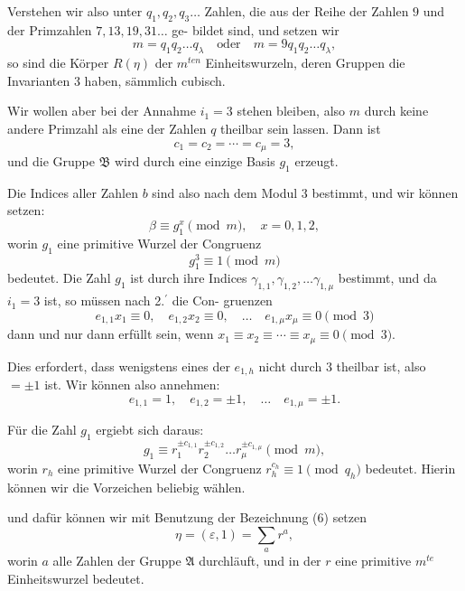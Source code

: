\documentclass[12pt,a4paper]{article}
\begin{document}
Verstehen wir also unter $q_1, q_2, q_3 \ldots$ Zahlen, die aus der
Reihe der Zahlen $9$ und der Primzahlen $7, 13, 19, 31\ldots$ ge-
bildet sind, und setzen wir
\[m = q_1 q_2 \ldots q_\lambda\quad \text{oder}\quad m = 9q_1 q_2 \ldots q_\lambda,\]
so sind die K\"orper $R(\eta)$ der $m^{ten}$ Einheitswurzeln, deren Gruppen
die Invarianten $3$ haben, s\"ammlich cubisch.

Wir wollen aber bei der Annahme $i_1 = 3$ stehen bleiben,
also $m$ durch keine andere Primzahl als eine der Zahlen $q$
theilbar sein lassen. Dann ist
\[c_1 = c_2 = \cdots = c_\mu = 3,\]
und die Gruppe $\mathfrak{B}$ wird durch eine einzige Basis $g_1$ erzeugt.

Die Indices aller Zahlen $b$ sind also nach dem Modul $3$
bestimmt, und wir k\"onnen setzen:
\begin{equation}\label{eq:k23-1}
\beta \equiv g_1^x \pmod{m},\quad x = 0, 1, 2,
\end{equation}
worin $g_1$ eine primitive Wurzel der Congruenz
\[g_1^3 \equiv 1 \pmod{m}\]
bedeutet. Die Zahl $g_1$ ist durch ihre Indices $\gamma_{1,1}, \gamma_{1,2}, \ldots \gamma_{1,\mu}$
bestimmt, und da $i_1 = 3$ ist, so m\"ussen nach 2.$^\prime$ die Con-
gruenzen
\[e_{1,1} x_1 \equiv 0,\quad e_{1,2} x_2 \equiv 0,\quad \ldots\quad e_{1,\mu} x_\mu \equiv 0 \pmod{3}\]
dann und nur dann erf\"ullt sein, wenn $x_1 \equiv x_2 \equiv \cdots \equiv x_\mu \equiv 0 \pmod{3}$.

Dies erfordert, dass wenigstens eines der $e_{1,h}$ nicht durch $3$
theilbar ist, also $= \pm 1$ ist. Wir k\"onnen also annehmen:
\begin{equation}\label{eq:k23-2}
e_{1,1} = 1,\quad e_{1,2} = \pm 1,\quad \ldots\quad e_{1,\mu} = \pm 1.
\end{equation}

F\"ur die Zahl $g_1$ ergiebt sich daraus:
\[g_1 \equiv r_1^{\pm c_{1,1}} r_2^{\pm c_{1,2}} \ldots r_\mu^{\pm c_{1,\mu}} \pmod{m},\]
worin $r_h$ eine primitive Wurzel der Congruenz $r_h^{c_h} \equiv 1 \pmod{q_h}$
bedeutet. Hierin k\"onnen wir die Vorzeichen beliebig w\"ahlen.

\newpage

\noindent und daf\"ur k\"onnen wir mit Benutzung der Bezeichnung (6) setzen
\begin{equation}\label{eq:k23-8}
\eta = (\varepsilon, 1) = \sum_a r^a,
\end{equation}
worin $a$ alle Zahlen der Gruppe $\mathfrak{A}$ durchl\"auft, und in der $r$ eine
primitive $m^{te}$ Einheitswurzel bedeutet.
\end{document}

